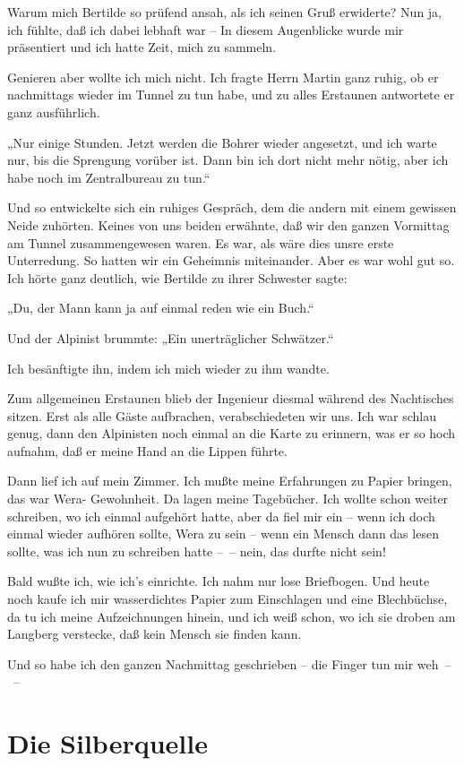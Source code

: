 Warum mich Bertilde so prüfend ansah, als ich seinen Gruß
erwiderte? Nun ja, ich fühlte, daß ich dabei lebhaft war – In
diesem Augenblicke wurde mir präsentiert und ich hatte Zeit, mich
zu sammeln.

Genieren aber wollte ich mich nicht. Ich fragte Herrn Martin ganz
ruhig, ob er nachmittags wieder im Tunnel zu tun habe, und zu alles
Erstaunen antwortete er ganz ausführlich.

„Nur einige Stunden. Jetzt werden die Bohrer wieder angesetzt, und
ich warte nur, bis die Sprengung vorüber ist. Dann bin ich dort
nicht mehr nötig, aber ich habe noch im Zentralbureau zu tun.“

Und so entwickelte sich ein ruhiges Gespräch, dem die andern mit
einem gewissen Neide zuhörten. Keines von uns beiden erwähnte, daß
wir den ganzen Vormittag am Tunnel zusammengewesen waren. Es war,
als wäre dies unsre erste Unterredung. So hatten wir ein Geheimnis
miteinander. Aber es war wohl gut so. Ich hörte ganz deutlich, wie
Bertilde zu ihrer Schwester sagte:

„Du, der Mann kann ja auf einmal reden wie ein Buch.“

Und der Alpinist brummte: „Ein unerträglicher Schwätzer.“

Ich besänftigte ihn, indem ich mich wieder zu ihm wandte.

Zum allgemeinen Erstaunen blieb der Ingenieur diesmal während des
Nachtisches sitzen. Erst als alle Gäste aufbrachen, verabschiedeten
wir uns. Ich war schlau genug, dann den Alpinisten noch einmal an
die Karte zu erinnern, was er so hoch aufnahm, daß er meine Hand an
die Lippen führte.

Dann lief ich auf mein Zimmer. Ich mußte meine Erfahrungen zu
Papier bringen, das war Wera- Gewohnheit. Da lagen meine Tagebücher.
Ich wollte schon weiter schreiben, wo ich einmal aufgehört hatte,
aber da fiel mir ein – wenn ich doch einmal wieder aufhören sollte,
Wera zu sein – wenn ein Mensch dann das lesen sollte, was ich nun
zu schreiben hatte –~– nein, das durfte nicht sein!

Bald wußte ich, wie ich's einrichte. Ich nahm nur lose Briefbogen.
Und heute noch kaufe ich mir wasserdichtes Papier zum Einschlagen
und eine Blechbüchse, da tu ich meine Aufzeichnungen hinein, und
ich weiß schon, wo ich sie droben am Langberg verstecke, daß kein
Mensch sie finden kann.

Und so habe ich den ganzen Nachmittag geschrieben – die Finger tun
mir weh~–~–

\section{Die Silberquelle}

